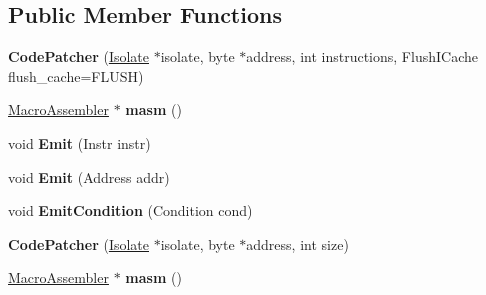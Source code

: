 \subsection*{Public Member Functions}
\begin{DoxyCompactItemize}
\item 
{\bfseries Code\+Patcher} (\hyperlink{classv8_1_1internal_1_1_isolate}{Isolate} $\ast$isolate, byte $\ast$address, int instructions, Flush\+I\+Cache flush\+\_\+cache=F\+L\+U\+SH)\hypertarget{classv8_1_1internal_1_1_code_patcher_a6437c3f8f928a65aa12b0a188c84c137}{}\label{classv8_1_1internal_1_1_code_patcher_a6437c3f8f928a65aa12b0a188c84c137}

\item 
\hyperlink{classv8_1_1internal_1_1_macro_assembler}{Macro\+Assembler} $\ast$ {\bfseries masm} ()\hypertarget{classv8_1_1internal_1_1_code_patcher_abb06694a38d62fd0a065cf42f2d025e2}{}\label{classv8_1_1internal_1_1_code_patcher_abb06694a38d62fd0a065cf42f2d025e2}

\item 
void {\bfseries Emit} (Instr instr)\hypertarget{classv8_1_1internal_1_1_code_patcher_ac0394155d6f5e17721942404e6d3e486}{}\label{classv8_1_1internal_1_1_code_patcher_ac0394155d6f5e17721942404e6d3e486}

\item 
void {\bfseries Emit} (Address addr)\hypertarget{classv8_1_1internal_1_1_code_patcher_a11eaccf67a0e270278fc1d0baaa74462}{}\label{classv8_1_1internal_1_1_code_patcher_a11eaccf67a0e270278fc1d0baaa74462}

\item 
void {\bfseries Emit\+Condition} (Condition cond)\hypertarget{classv8_1_1internal_1_1_code_patcher_a45c72f30807f576dc05b0a53e166d40a}{}\label{classv8_1_1internal_1_1_code_patcher_a45c72f30807f576dc05b0a53e166d40a}

\item 
{\bfseries Code\+Patcher} (\hyperlink{classv8_1_1internal_1_1_isolate}{Isolate} $\ast$isolate, byte $\ast$address, int size)\hypertarget{classv8_1_1internal_1_1_code_patcher_aba34590d22b0830620e3782c15df0969}{}\label{classv8_1_1internal_1_1_code_patcher_aba34590d22b0830620e3782c15df0969}

\item 
\hyperlink{classv8_1_1internal_1_1_macro_assembler}{Macro\+Assembler} $\ast$ {\bfseries masm} ()\hypertarget{classv8_1_1internal_1_1_code_patcher_abb06694a38d62fd0a065cf42f2d025e2}{}\label{classv8_1_1internal_1_1_code_patcher_abb06694a38d62fd0a065cf42f2d025e2}


\end{DoxyCompactItemize}

